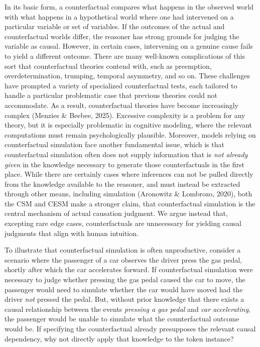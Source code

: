 \documentclass[10pt,letterpaper]{article}
\begin{document}
In its basic form, a counterfactual compares what happens in the observed world with what happens in a hypothetical world where one had intervened on a particular variable or set of variables. If the outcomes of the actual and counterfactual worlds differ, the reasoner has strong grounds for judging the variable as causal. However, in certain cases, intervening on a genuine cause fails to yield a different outcome. There are many well-known complications of this sort that counterfactual theories contend with, such as preemption, overdetermination, trumping, temporal asymmetry, and so on. These challenges have prompted a variety of specialized counterfactual tests, each tailored to handle a particular problematic case that previous theories could not accommodate. As a result, counterfactual theories have become increasingly complex (Menzies \& Beebee, 2025). Excessive complexity is a problem for any theory, but it is especially problematic in cognitive modeling, where the relevant computations must remain psychologically plausible. Moreover, models relying on counterfactual simulation face another fundamental issue, which is that counterfactual simulation often does not supply information that is \textit{not already given} in the knowledge necessary to generate those counterfactuals in the first place. While there are certainly cases where inferences can not be pulled directly from the knowledge available to the reasoner, and must instead be extracted through other means, including simulation (Aronowitz \& Lombrozo, 2020), both the CSM and CESM make a stronger claim, that counterfactual simulation is the central mechanism of actual causation judgment. We argue instead that, excepting rare edge cases, counterfactuals are unnecessary for yielding causal judgments that align with human intuition.

To illustrate that counterfactual simulation is often unproductive, consider a scenario where the passenger of a car observes the driver press the gas pedal, shortly after which the car accelerates forward. If counterfactual simulation were necessary to judge whether pressing the gas pedal caused the car to move, the passenger would need to simulate whether the car would have moved had the driver \textit{not} pressed the pedal. But, without prior knowledge that there exists a causal relationship between the events \textit{pressing a gas pedal} and \textit{car accelerating}, the passenger would be unable to simulate what the counterfactual outcome would be. If specifying the counterfactual already presupposes the relevant causal dependency, why not directly apply that knowledge to the token instance?
\end{document}
